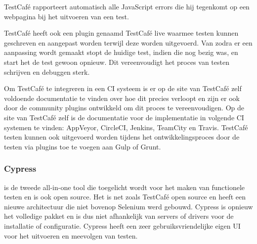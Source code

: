 TestCafé rapporteert automatisch alle JavaScript errors die hij tegenkomt op een webpagina bij het uitvoeren van een test.

TestCafé heeft ook een plugin genaamd TestCafé live waarmee testen kunnen geschreven en aangepast worden terwijl deze worden uitgevoerd. Van zodra er een aanpassing wordt gemaakt stopt de huidige test, indien die nog bezig was, en start het de test gewoon opnieuw. Dit vereenvoudigt het proces van testen schrijven en debuggen sterk.



Om TestCafé te integreren in een \gls{CI} systeem is er op de site van TestCafé zelf voldoende documentatie te vinden over hoe dit precies verloopt en zijn er ook door de community plugins ontwikkeld om dit proces te vereenvoudigen. Op de site van TestCafé zelf is de documentatie voor de implementatie in volgende \gls{CI} systemen te vinden: AppVeyor, CircleCI, Jenkins, TeamCity en Travis. TestCafé testen kunnen ook uitgevoerd worden tijdens het ontwikkelingsproces door de testen via plugins toe te voegen aan \gls{Gulp} of \gls{Grunt}. 


\subsubsection{Cypress}
\textcite{Cypress} is de tweede all-in-one \gls{tool} die toegelicht wordt voor het maken van functionele testen en is ook open source. Het is net zoals TestCafé open source en heeft een nieuwe architectuur die niet bovenop Selenium werd gebouwd. Cypress is opnieuw het volledige pakket en is dus niet afhankelijk van servers of drivers voor de installatie of configuratie. Cypress heeft een zeer gebruiksvriendelijke eigen \gls{UI} voor het uitvoeren en meevolgen van testen.

